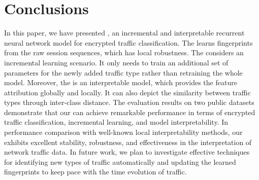\section{Conclusions}
\label{sec:Conclusions}
In this paper,  we have presented \sys, an incremental and interpretable recurrent neural network model for encrypted traffic classification. 
The \sys learns fingerprints from the raw session sequences, which has local robustness. 
The \sys considers an incremental learning scenario. %
It only needs to train an additional set of parameters for the newly added traffic type rather than retraining the whole model.  
Moreover, the \sys is an interpretable model, which provides the feature attribution globally and locally. 
It can also depict the similarity between traffic types through inter-class distance.
The evaluation results on two public datasets demonstrate that our \sys can achieve remarkable performance in terms of encrypted traffic classification, incremental learning, and model interpretability. 
In performance comparison with well-known local interpretability methods, our \sys exhibits excellent stability, robustness, and effectiveness in the interpretation of network traffic data. 
In future work,  we plan to investigate effective techniques for identifying new types of traffic automatically and updating the learned fingerprints to keep pace with the time evolution of traffic.